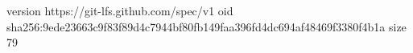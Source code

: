 version https://git-lfs.github.com/spec/v1
oid sha256:9ede23663c9f83f89d4c7944bf80fb149faa396fd4dc694af48469f3380f4b1a
size 79
